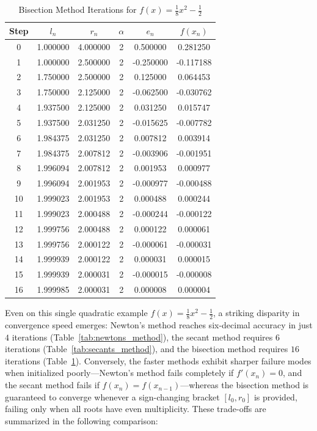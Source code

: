 \documentclass{amsart}
\begin{document}
\begin{table}[ht]
\centering
\caption{Bisection Method Iterations for $f(x) = \frac{1}{8}x^2 - \frac{1}{2}$}
\label{tab:bisection_method}
\begin{tabular}{|c|c|c|c|c|c|}
\hline
Step & $l_n$ & $r_n$ & $\alpha$ & $e_n$ & $f(x_n)$ \\
\hline
0 & 1.000000 & 4.000000 & 2 & 0.500000 & 0.281250 \\
\hline
1 & 1.000000 & 2.500000 & 2 & -0.250000 & -0.117188 \\
\hline
2 & 1.750000 & 2.500000 & 2 & 0.125000 & 0.064453 \\
\hline
3 & 1.750000 & 2.125000 & 2 & -0.062500 & -0.030762 \\
\hline
4 & 1.937500 & 2.125000 & 2 & 0.031250 & 0.015747 \\
\hline
5 & 1.937500 & 2.031250 & 2 & -0.015625 & -0.007782 \\
\hline
6 & 1.984375 & 2.031250 & 2 & 0.007812 & 0.003914 \\
\hline
7 & 1.984375 & 2.007812 & 2 & -0.003906 & -0.001951 \\
\hline
8 & 1.996094 & 2.007812 & 2 & 0.001953 & 0.000977 \\
\hline
9 & 1.996094 & 2.001953 & 2 & -0.000977 & -0.000488 \\
\hline
10 & 1.999023 & 2.001953 & 2 & 0.000488 & 0.000244 \\
\hline
11 & 1.999023 & 2.000488 & 2 & -0.000244 & -0.000122 \\
\hline
12 & 1.999756 & 2.000488 & 2 & 0.000122 & 0.000061 \\
\hline
13 & 1.999756 & 2.000122 & 2 & -0.000061 & -0.000031 \\
\hline
14 & 1.999939 & 2.000122 & 2 & 0.000031 & 0.000015 \\
\hline
15 & 1.999939 & 2.000031 & 2 & -0.000015 & -0.000008 \\
\hline
16 & 1.999985 & 2.000031 & 2 & 0.000008 & 0.000004 \\
\hline
\end{tabular}
\end{table}

Even on this single quadratic example $f(x) = \frac{1}{8}x^2 - \frac{1}{2}$, a striking disparity in convergence speed emerges: Newton's method reaches six-decimal accuracy in just $4$ iterations (Table~\ref{tab:newtons_method}), the secant method requires $6$ iterations (Table~\ref{tab:secants_method}), and the bisection method requires $16$ iterations (Table~\ref{tab:bisection_method}). Conversely, the faster methods exhibit sharper failure modes when initialized poorly—Newton's method fails completely if $f'(x_n) = 0$, and the secant method fails if $f(x_n) = f(x_{n-1})$—whereas the bisection method is guaranteed to converge whenever a sign-changing bracket $[l_0, r_0]$ is provided, failing only when all roots have even multiplicity. These trade-offs are summarized in the following comparison:
\end{document}
